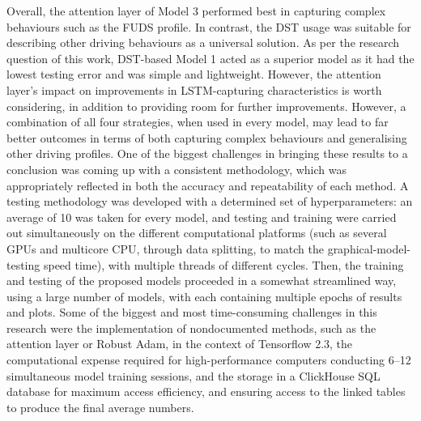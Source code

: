 %
%
Overall, the attention layer of Model 3 performed best in capturing complex behaviours such as the FUDS profile.
In contrast, the DST usage was suitable for describing other driving behaviours as a universal solution.
As per the research question of this work, DST-based Model 1 acted as a superior model as it had the lowest testing error and was simple and lightweight.
However, the attention layer's impact on improvements in LSTM-capturing characteristics is worth considering, in addition to providing room for further improvements.
However, a combination of all four strategies, when used in every model, may lead to far better outcomes in terms of both capturing complex behaviours and generalising other driving profiles.
One of the biggest challenges in bringing these results to a conclusion was coming up with a consistent methodology, which was appropriately reflected in both the accuracy and repeatability of each method.
A testing methodology was developed with a determined set of hyperparameters: an average of 10 was taken for every model, and testing and training were carried out simultaneously on the different computational platforms (such as several GPUs and multicore CPU, through data splitting, to match the graphical-model-testing speed time), with multiple threads of different cycles.
Then, the training and testing of the proposed models proceeded in a somewhat streamlined way, using a large number of models, with each containing multiple epochs of results and plots.
Some of the biggest and most time-consuming challenges in this research were the implementation of nondocumented methods, such as the attention layer or Robust Adam, in the context of Tensorflow 2.3, the computational expense required for high-performance computers conducting 6--12 simultaneous model training sessions, and the storage in a ClickHouse SQL database for maximum access efficiency, and ensuring access to the linked tables to produce the final average numbers.
%
%

%
%


